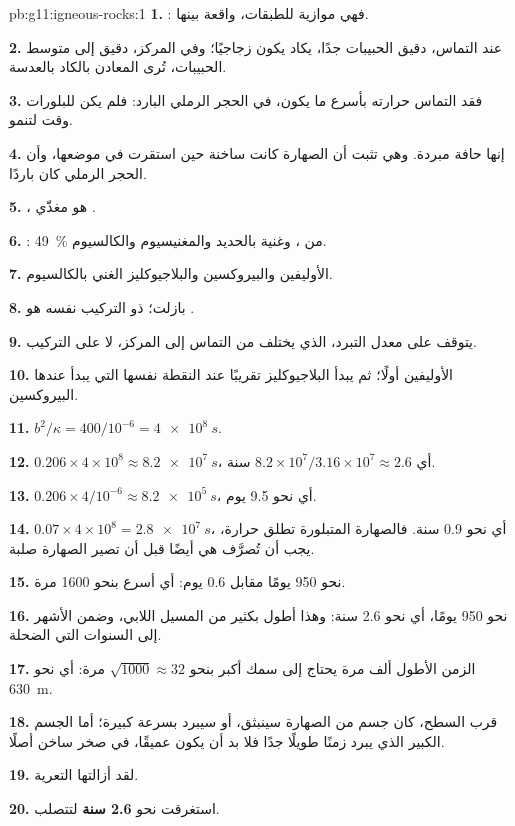 \begin{solution}{pb:g11:igneous-rocks:1}
\textbf{1.} : فهي موازية للطبقات، واقعة بينها.

\textbf{2.} عند التماس، دقيق الحبيبات جدًا، يكاد يكون زجاجيًا؛ وفي المركز،
دقيق إلى متوسط الحبيبات، تُرى المعادن بالكاد بالعدسة.

\textbf{3.} فقد التماس حرارته بأسرع ما يكون، في الحجر الرملي البارد: فلم يكن
للبلورات وقت لتنمو.

\textbf{4.} إنها حافة مبردة. وهي تثبت أن الصهارة كانت ساخنة حين استقرت
في موضعها، وأن الحجر الرملي كان باردًا.

\textbf{5.} ، هو مغذّي .

\textbf{6.} : \qty{49}{\percent} من ، وغنية بالحديد والمغنيسيوم
والكالسيوم.

\textbf{7.} الأوليفين والبيروكسين والبلاجيوكليز الغني بالكالسيوم.

\textbf{8.} بازلت؛  ذو التركيب نفسه هو .

\textbf{9.} يتوقف  على معدل التبرد، الذي يختلف من
التماس إلى المركز، لا على التركيب.

\textbf{10.} الأوليفين أولًا؛ ثم يبدأ البلاجيوكليز تقريبًا عند النقطة نفسها التي يبدأ عندها
البيروكسين.

\textbf{11.} $b^2/\kappa = 400/10^{-6} = \qty{4e8}{s}$.

\textbf{12.} $0.206 \times 4 \times 10^8 \approx \qty{8.2e7}{s}$، أي
$8.2 \times 10^7 / 3.16 \times 10^7 \approx 2.6$ سنة.

\textbf{13.} $0.206 \times 4/10^{-6} \approx \qty{8.2e5}{s}$، أي نحو 9.5
يوم.

\textbf{14.} $0.07 \times 4 \times 10^8 = \qty{2.8e7}{s}$، أي نحو 0.9 سنة.
فالصهارة المتبلورة تطلق حرارة، يجب أن تُصرَّف هي أيضًا قبل
أن تصير الصهارة صلبة.

\textbf{15.} نحو 950 يومًا مقابل 0.6 يوم: أي أسرع بنحو 1600 مرة.

\textbf{16.} نحو 950 يومًا، أي نحو 2.6 سنة: وهذا أطول بكثير من المسيل اللابي،
وضمن الأشهر إلى السنوات التي  الضحلة.

\textbf{17.} الزمن الأطول ألف مرة يحتاج إلى سمك أكبر بنحو $\sqrt{1000} \approx
32$ مرة: أي نحو \qty{630}{m}.

\textbf{18.} قرب السطح، كان جسم من الصهارة سينبثق، أو سيبرد بسرعة كبيرة؛
أما الجسم الكبير الذي يبرد زمنًا طويلًا جدًا فلا بد أن يكون عميقًا، في صخر
ساخن أصلًا.

\textbf{19.} لقد أزالتها التعرية.

\textbf{20.} استغرقت  نحو \textbf{2.6 سنة} لتتصلب.
\end{solution}

